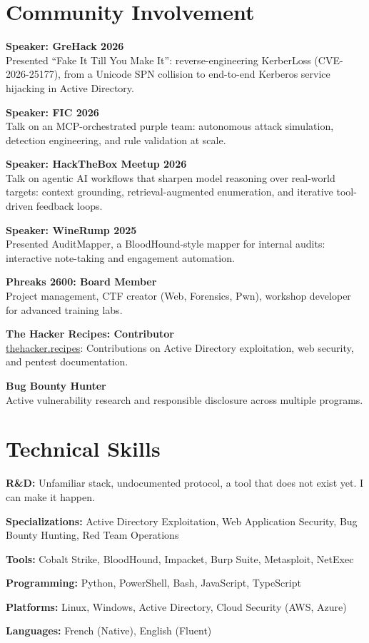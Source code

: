 \documentclass[9pt,a4paper]{extarticle}
\begin{document}
\begin{minipage}[t]{0.48\textwidth}

\section{Community Involvement}

\textbf{Speaker: GreHack 2026} \\
Presented ``Fake It Till You Make It'': reverse-engineering KerberLoss (CVE-2026-25177), from a Unicode SPN collision to end-to-end Kerberos service hijacking in Active Directory.

\textbf{Speaker: FIC 2026} \\
Talk on an MCP-orchestrated purple team: autonomous attack simulation, detection engineering, and rule validation at scale.

\textbf{Speaker: HackTheBox Meetup 2026} \\
Talk on agentic AI workflows that sharpen model reasoning over real-world targets: context grounding, retrieval-augmented enumeration, and iterative tool-driven feedback loops.

\textbf{Speaker: WineRump 2025} \\
Presented AuditMapper, a BloodHound-style mapper for internal audits: interactive note-taking and engagement automation.

\textbf{Phreaks 2600: Board Member} \\
Project management, CTF creator (Web, Forensics, Pwn), workshop developer for advanced training labs.

\textbf{The Hacker Recipes: Contributor} \\
\href{https://thehacker.recipes}{thehacker.recipes}: Contributions on Active Directory exploitation, web security, and pentest documentation.

\textbf{Bug Bounty Hunter} \\
Active vulnerability research and responsible disclosure across multiple programs.

\section{Technical Skills}

\textbf{R\&D:} Unfamiliar stack, undocumented protocol, a tool that does not exist yet. I can make it happen.

\textbf{Specializations:} Active Directory Exploitation, Web Application Security, Bug Bounty Hunting, Red Team Operations

\textbf{Tools:} Cobalt Strike, BloodHound, Impacket, Burp Suite, Metasploit, NetExec

\textbf{Programming:} Python, PowerShell, Bash, JavaScript, TypeScript

\textbf{Platforms:} Linux, Windows, Active Directory, Cloud Security (AWS, Azure)

\textbf{Languages:} French (Native), English (Fluent)

\end{minipage}
\end{document}
